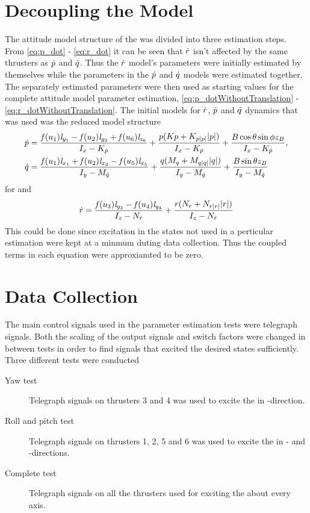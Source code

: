 \section{Decoupling the Model} 
The attitude model structure of the \abbrROV was divided into three estimation steps. From \eqref{eq:p_dot} - \eqref{eq:r_dot} it can be seen that $\dot{r}$ isn't affected by the same thrusters as $\dot{p}$ and $\dot{q}$. Thus the $\dot{r}$ model's parameters were initially estimated by themselves while the parameters in the $\dot{p}$ and $\dot{q}$ models were estimated together. The separately estimated parameters were then used as starting values for the complete attitude model parameter estimation, \eqref{eq:p_dotWithoutTranslation} - \eqref{eq:r_dotWithoutTranslation}. The initial models for $\dot{r}$, $\dot{p}$ and $\dot{q}$ dynamics that was used was the reduced model structure
\begin{align} \label{eq:pq_dot_simple}
\dot{p} &= \frac{\mathit{f}(u_{1}) \mathit{l}_{y_{1}} - \mathit{f}(u_{2}) \mathit{l}_{y_{2}} + \mathit{f}(u_{6}) \mathit{l}_{z_{6}}}{I_{x} - K_{\dot{p}}} + \frac{p (Kp + K_{p|p|} |p|)}{I_{x} - K_{\dot{p}}} + \frac{B \cos{\theta} \sin{\phi} z_B}{I_{x} - K_{\dot{p}}}, \\ \label{eq:pq_dot_simple2}
\dot{q} &=\frac{\mathit{f}(u_{1}) \mathit{l}_{x_{1}} + \mathit{f}(u_{2}) \mathit{l}_{x_{2}} - \mathit{f}(u_{5}) \mathit{l}_{x_{5}}}{I_{y} - M_{\dot{q}}} + \frac{q (M_{q} + M_{q|q|} |q|)}{I_{y} - M_{\dot{q}}} + \frac{B \sin{\theta} z_B}{I_{y} - M_{\dot{q}}} 
\end{align} for and
\begin{equation} \label{eq:r_dot_simple}
\dot{r} = \frac{\mathit{f}(u_{3}) \mathit{l}_{y_{3}} - \mathit{f}(u_{4}) \mathit{l}_{y_{4}}}{I_{z} - N_{\dot{r}}} + \frac{r (N_{r} + N_{r|r|} |r|)}{I_{z} - N_{\dot{r}}}
\end{equation}
This could be done since excitation in the states not used in a perticular estimation were kept at a minmum duting data collection. Thus the coupled terms in each equation were approxiamted to be zero.

\section{Data Collection} 
The main control signals used in the parameter estimation tests were telegraph signals. Both the scaling of the output signals and switch factors were changed in between tests in order to find signals that excited the desired states sufficiently.
Three different tests were conducted 
\begin{description}
\item[Yaw test] Telegraph signals on thrusters 3 and 4 was used to excite the \abbrROV in \yawAngle-direction.
\item[Roll and pitch test] Telegraph signals on thrusters 1, 2, 5 and 6 was used to excite the \abbrROV in \rollAngle- and \pitchAngle-directions.
\item[Complete test] Telegraph signals on all the thrusters used for exciting the \abbrROV about every axis.
\end{description}

